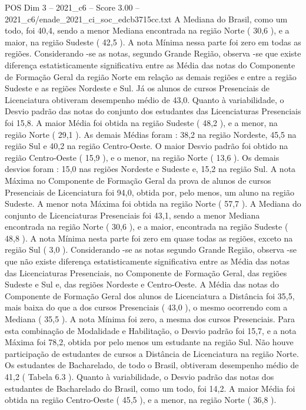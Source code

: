 \begin{textsample}{POS Dim 3 – 2021\_c6 – Score 3.00 – 2021\_c6/enade\_2021\_ci\_soc\_edcb3715cc.txt}
A Mediana do Brasil, como um todo, foi 40,4, sendo a menor Mediana encontrada na região Norte ( 30,6 ), e a maior, na região Sudeste ( 42,5 ).
A nota Mínima nessa parte foi zero em todas as regiões.
Considerando -se as notas, segundo Grande Região, observa -se que existe diferença estatisticamente significativa entre as Média das notas do Componente de Formação Geral da região Norte em relação as demais regiões e entre a região Sudeste e as regiões Nordeste e Sul.
Já os alunos de cursos Presenciais de Licenciatura obtiveram desempenho médio de 43,0.
Quanto à variabilidade, o Desvio padrão das notas do conjunto dos estudantes das Licenciaturas Presenciais foi 15,8.
A maior Média foi obtida na região Sudeste ( 48,2 ), e a menor, na região Norte ( 29,1 ).
As demais Médias foram : 38,2 na região Nordeste, 45,5 na região Sul e 40,2 na região Centro-Oeste.
O maior Desvio padrão foi obtido na região Centro-Oeste ( 15,9 ), e o menor, na região Norte ( 13,6 ).
Os demais desvios foram : 15,0 nas regiões Nordeste e Sudeste e, 15,2 na região Sul.
A nota Máxima no Componente de Formação Geral da prova de alunos de cursos Presenciais de Licenciatura foi 94,0, obtida por, pelo menos, um aluno na região Sudeste.
A menor nota Máxima foi obtida na região Norte ( 57,7 ).
A Mediana do conjunto de Licenciaturas Presenciais foi 43,1, sendo a menor Mediana encontrada na região Norte ( 30,6 ), e a maior, encontrada na região Sudeste ( 48,8 ).
A nota Mínima nesta parte foi zero em quase todas as regiões, exceto na região Sul ( 3,0 ).
Considerando -se as notas segundo Grande Região, observa -se que não existe diferença estatisticamente significativa entre as Média das notas das Licenciaturas Presenciais, no Componente de Formação Geral, das regiões Sudeste e Sul e, das regiões Nordeste e Centro-Oeste.
A Média das notas do Componente de Formação Geral dos alunos de Licenciatura a Distância foi 35,5, mais baixa do que a dos cursos Presenciais ( 43,0 ), o mesmo ocorrendo com a Mediana ( 35,5 ).
A nota Mínima foi zero, a mesma dos cursos Presenciais.
Para esta combinação de Modalidade e Habilitação, o Desvio padrão foi 15,7, e a nota Máxima foi 78,2, obtida por pelo menos um estudante na região Sul.
Não houve participação de estudantes de cursos a Distância de Licenciatura na região Norte.
Os estudantes de Bacharelado, de todo o Brasil, obtiveram desempenho médio de 41,2 ( Tabela 6.3 ).
Quanto à variabilidade, o Desvio padrão das notas dos estudantes de Bacharelado do Brasil, como um todo, foi 14,2.
A maior Média foi obtida na região Centro-Oeste ( 45,5 ), e a menor, na região Norte ( 36,8 ).

\end{textsample}
